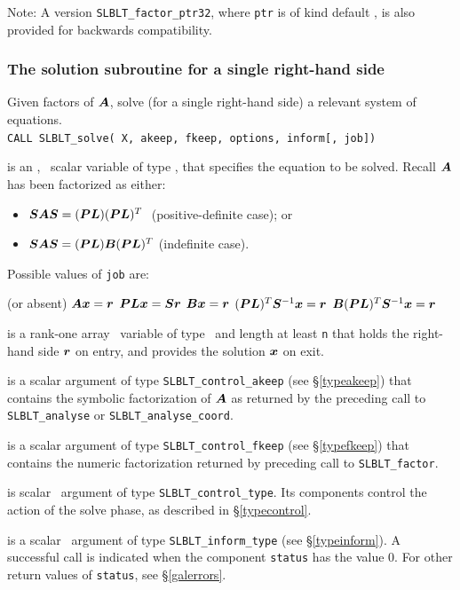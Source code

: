 \documentclass{galahad}
\newcommand{\packagename}{SLBLT}
\begin{document}
Note:
A version {\tt \packagename\_factor\_ptr32},
where {\tt ptr} is of kind default \integer, is also provided for
backwards compatibility.


\subsubsection{The solution subroutine for a single right-hand side}

Given factors of ${\bm{A}}$, solve (for a single right-hand side) a relevant 
system of equations.\\

\hskip0.5in
{\tt CALL \packagename\_solve( X, akeep, fkeep, options, inform{[}, job{]})}

\begin{description}

is an \optional, \intentin\ scalar variable of type \integer,
that specifies the equation to be solved. 
Recall ${\bm{A}}$ has been factorized as either:
\begin{itemize}
\item{} 
${\bm{S}}{\bm{A}}{\bm{S}} = ({\bm{P}}{\bm{L}})({\bm{P}}{\bm{L}})^T~$ (positive-definite case); or
\item{} 
${\bm{S}}{\bm{A}}{\bm{S}} = ({\bm{P}}{\bm{L}}){\bm{B}}({\bm{P}}{\bm{L}})^T$ (indefinite case).
\end{itemize}
Possible values of {\tt job} are:
\begin{description}
 (or absent) ${\bm{A}}{\bm{x}}={\bm{r}}$
 ${\bm{P}}{\bm{L}}{\bm{x}}={\bm{S}}{\bm{r}}$
 ${\bm{B}}{\bm{x}}={\bm{r}}$
 $({\bm{P}}{\bm{L}})^T{\bm{S}}^{-1}{\bm{x}}={\bm{r}}$
 ${\bm{B}}({\bm{P}}{\bm{L}})^T{\bm{S}}^{-1}{\bm{x}}={\bm{r}}$
\end{description}

 is a rank-one array \intentinout\ variable of type \realdp\ and 
length at least {\tt n} that holds the right-hand side ${\bm{r}}$ on entry, 
and provides the  solution ${\bm{x}}$ on exit.

 is a scalar \intentin argument of type
{\tt \packagename\_control\_akeep} (see \S\ref{typeakeep}) that contains the 
symbolic factorization of ${\bm{A}}$ as returned by the preceding call
to {\tt \packagename\_analyse} or {\tt \packagename\_analyse\_coord}.

 is a scalar \intentinout argument of type
{\tt \packagename\_control\_fkeep} (see \S\ref{typefkeep}) that contains the 
numeric factorization returned by preceding call to {\tt \packagename\_factor}.

 is scalar \intentin\ argument of type
{\tt \packagename\_control\_type}. Its components control the action
of the solve phase, as described in \S\ref{typecontrol}.

 is a scalar \intentinout\ argument of type
{\tt \packagename\_inform\_type} (see \S\ref{typeinform}).
A successful call is indicated when the  component {\tt status} has the value 0.
For other return values of {\tt status}, see \S\ref{galerrors}.

\end{description}
\end{document}
